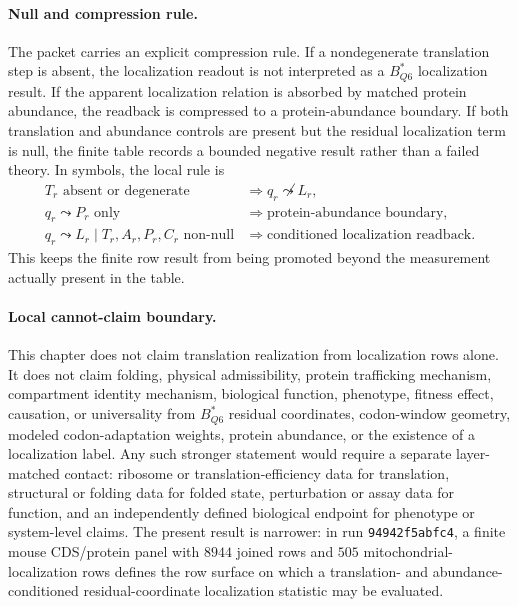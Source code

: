 \paragraph{Null and compression rule.}
The packet carries an explicit compression rule.  If a nondegenerate translation step is absent, the localization readout is not interpreted as a $B^{*}_{Q6}$ localization result.  If the apparent localization relation is absorbed by matched protein abundance, the readback is compressed to a protein-abundance boundary.  If both translation and abundance controls are present but the residual localization term is null, the finite table records a bounded negative result rather than a failed theory.  In symbols, the local rule is
$$
\begin{aligned}
T_r \text{ absent or degenerate} &\Rightarrow q_r \not\leadsto L_r,\\
q_r \leadsto P_r \text{ only} &\Rightarrow \text{protein-abundance boundary},\\
q_r \leadsto L_r \mid T_r,A_r,P_r,C_r \text{ non-null} &\Rightarrow \text{conditioned localization readback}.
\end{aligned}
$$
This keeps the finite row result from being promoted beyond the measurement actually present in the table.

\paragraph{Local cannot-claim boundary.}
This chapter does not claim translation realization from localization rows alone.  It does not claim folding, physical admissibility, protein trafficking mechanism, compartment identity mechanism, biological function, phenotype, fitness effect, causation, or universality from $B^{*}_{Q6}$ residual coordinates, codon-window geometry, modeled codon-adaptation weights, protein abundance, or the existence of a localization label.  Any such stronger statement would require a separate layer-matched contact: ribosome or translation-efficiency data for translation, structural or folding data for folded state, perturbation or assay data for function, and an independently defined biological endpoint for phenotype or system-level claims.  The present result is narrower: in run \texttt{94942f5abfc4}, a finite mouse CDS/protein panel with $8944$ joined rows and $505$ mitochondrial-localization rows defines the row surface on which a translation- and abundance-conditioned residual-coordinate localization statistic may be evaluated.